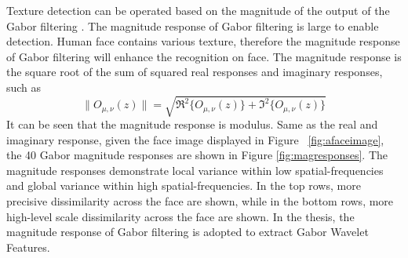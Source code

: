 Texture detection can be operated based on the magnitude of the output of the Gabor filtering \cite{Bovik1990}. The magnitude response of Gabor filtering is large to enable detection. Human face contains various texture, therefore the magnitude response of Gabor filtering will enhance the recognition on face. The magnitude response is the square root of the sum of squared real responses and imaginary responses, such as
\begin{equation}
 \|O_{\mu,\nu}(z)\| = \sqrt{\Re^2\{O_{\mu,\nu}(z)\} + \Im^2\{O_{\mu,\nu}(z)\}}
\end{equation}
It can be seen that the magnitude response is modulus. Same as the real and imaginary response, given the face image displayed in \mbox{Figure} ~\ref{fig:afaceimage}, the 40 Gabor magnitude responses are shown in \mbox{Figure} \ref{fig:magresponses}. The magnitude responses demonstrate local variance within low spatial-frequencies and global variance within high spatial-frequencies.  In the top rows, more precisive dissimilarity across the face are shown, while in the bottom rows, more high-level scale dissimilarity across the face are shown. In the thesis, the magnitude response of Gabor filtering is adopted to extract Gabor Wavelet Features. 
